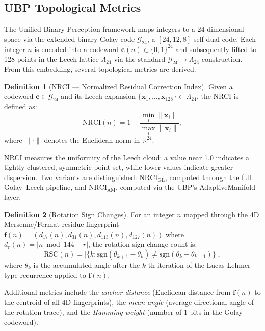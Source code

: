 \documentclass[11pt,a4paper]{article}
\theoremstyle{definition}
\newtheorem{definition}{Definition}[section]
\newcommand{\R}{\mathbb{R}}
\begin{document}
\subsection{UBP Topological Metrics}\label{sec:ubp}

The Unified Binary Perception framework maps integers to a 24-dimensional space via the extended binary Golay code $\mathcal{G}_{24}$, a $[24, 12, 8]$ self-dual code. Each integer $n$ is encoded into a codeword $\mathbf{c}(n) \in \{0,1\}^{24}$ and subsequently lifted to 128 points in the Leech lattice $\Lambda_{24}$ via the standard $\mathcal{G}_{24} \to \Lambda_{24}$ construction. From this embedding, several topological metrics are derived.

\begin{definition}[NRCI --- Normalized Residual Correction Index]\label{def:nrci}
Given a codeword $\mathbf{c} \in \mathcal{G}_{24}$ and its Leech expansion $\{\mathbf{x}_1, \ldots, \mathbf{x}_{128}\} \subset \Lambda_{24}$, the NRCI is defined as:
\begin{equation}\label{eq:nrci}
\text{NRCI}(n) = 1 - \frac{\min_i \|\mathbf{x}_i\|}{\max_i \|\mathbf{x}_i\|},
\end{equation}
where $\|\cdot\|$ denotes the Euclidean norm in $\R^{24}$.
\end{definition}

NRCI measures the uniformity of the Leech cloud: a value near 1.0 indicates a tightly clustered, symmetric point set, while lower values indicate greater dispersion. Two variants are distinguished: $\text{NRCI}_{\text{GL}}$, computed through the full Golay--Leech pipeline, and $\text{NRCI}_{\text{AM}}$, computed via the UBP's AdaptiveManifold layer.

\begin{definition}[Rotation Sign Changes]\label{def:rotsc}
For an integer $n$ mapped through the 4D Mersenne/Fermat residue fingerprint $\mathbf{f}(n) = (d_{17}(n), d_{31}(n), d_{113}(n), d_{127}(n))$ where $d_r(n) = |n \bmod 144 - r|$, the rotation sign change count is:
\begin{equation}\label{eq:rotsc}
\text{RSC}(n) = \bigl|\{k : \text{sgn}(\theta_{k+1} - \theta_k) \neq \text{sgn}(\theta_k - \theta_{k-1})\}\bigr|,
\end{equation}
where $\theta_k$ is the accumulated angle after the $k$-th iteration of the Lucas-Lehmer-type recurrence applied to $\mathbf{f}(n)$.
\end{definition}

Additional metrics include the \emph{anchor distance} (Euclidean distance from $\mathbf{f}(n)$ to the centroid of all 4D fingerprints), the \emph{mean angle} (average directional angle of the rotation trace), and the \emph{Hamming weight} (number of 1-bits in the Golay codeword).
\end{document}
